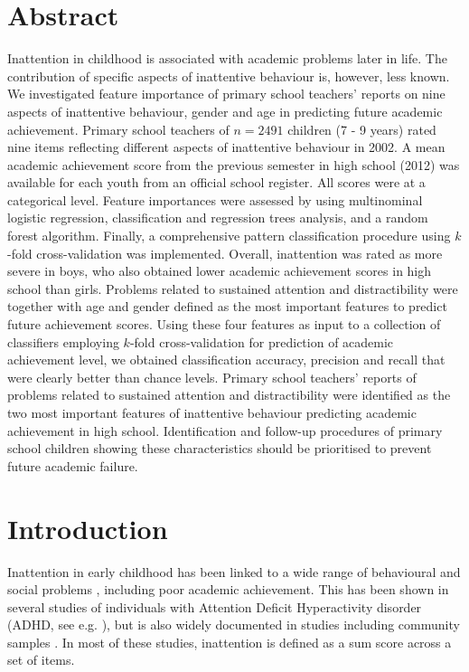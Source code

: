 \documentclass[10pt,letterpaper]{article}
\begin{document}
\section*{Abstract}
Inattention in childhood is associated with academic problems later in life. The contribution of specific aspects of inattentive behaviour is, however, less known. We investigated feature importance of primary school teachers' reports on nine aspects of inattentive behaviour, gender and age in predicting future academic achievement. Primary school teachers of $n=2491$ children (7 - 9 years) rated nine items reflecting different aspects of inattentive behaviour in 2002. A mean academic achievement score from the previous semester in high school (2012) was available for each youth from an official school register. All scores were at a categorical level. Feature importances were assessed by using multinominal logistic regression, classification and regression trees analysis, and a random forest algorithm. Finally, a comprehensive pattern classification procedure using $k$-fold cross-validation was implemented.
Overall, inattention was rated as more severe in boys, who also obtained lower academic achievement scores in high school than girls. Problems related to sustained attention and distractibility were together with age and gender defined as the most important features to predict future achievement scores. 
Using these four features as input to a collection of  classifiers
employing $k$-fold cross-validation for prediction of academic achievement level, we obtained classification accuracy, precision and recall that were clearly better than chance levels. 
Primary school teachers' reports of problems related to sustained attention and distractibility were identified as the two most important features of inattentive behaviour predicting academic achievement in high school.  Identification and follow-up procedures of primary school children showing these characteristics should be prioritised to prevent future academic failure.


\linenumbers

\section*{Introduction}
Inattention in early childhood has been linked to a wide range of behavioural and social problems \cite{Bellanti2000, Connors2012},  including poor academic achievement. This has been shown in several studies of individuals with Attention Deficit Hyperactivity disorder 
(ADHD, see e.g. \cite{Lee2006, Owens2017}), but is also widely documented in studies including community samples \cite{Polderman2010, Metcalfe2013, Pingault2014, Garner2013, Holmberg2014, Gray2014, Salla2016}.  In most of these studies, inattention is defined as a sum score across a set of items.
\end{document}
